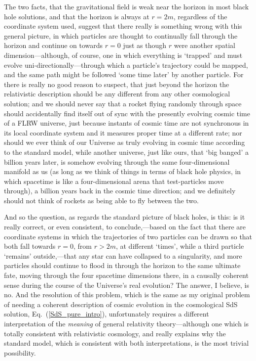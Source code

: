 The two facts, that the gravitational field is weak near the horizon in most black hole solutions, and that the horizon is always at $r=2m$, regardless of the coordinate system used, suggest that there really is something wrong with this general picture, in which particles are thought to continually fall through the horizon and continue on towards $r=0$ just as though $r$ were another spatial dimension---although, of course, one in which everything is `trapped' and must evolve uni-directionally---through which a particle's trajectory could be mapped, and the same path might be followed `some time later' by another particle.  For there is really no good reason to suspect, that just beyond the horizon the relativistic description should be any different from any other cosmological solution; and we should never say that a rocket flying randomly through space should accidentally find itself out of sync with the presently evolving cosmic time of a FLRW universe, just because instants of cosmic time are not synchronous in its local coordinate system and it measures proper time at a different rate; nor should we ever think of our Universe as truly evolving in cosmic time according to the standard model, while another universe, just like ours, that `big banged' a billion years later, is somehow evolving through the same four-dimensional manifold as us (as long as we think of things in terms of black hole physics, in which spacetime is like a four-dimensional arena that test-particles move through), a billion years back in the cosmic time direction; and we definitely should not think of rockets as being able to fly between the two.

And so the question, as regards the standard picture of black holes, is this: is it really correct, or even consistent, to conclude,---based on the fact that there are coordinate systems in which the trajectories of two particles can be drawn so that both fall towards $r=0$, from $r>2m$, at different `times', while a third particle `remains' outside,---that any star can have collapsed to a singularity, and more particles should continue to flood in through the horizon to the same ultimate fate, moving through the four spacetime dimensions there, in a causally coherent sense during the course of the Universe's real evolution? The answer, I believe, is no. And the resolution of this problem, which is the same as my original problem of needing a coherent description of cosmic evolution in the cosmological SdS solution, Eq.~(\ref{SdS_pure_intro}), unfortunately requires a different interpretation of the \textit{meaning} of general relativity theory---although one which is totally consistent with relativistic cosmology, and really explains why the standard model, which is consistent with both interpretations, is the most trivial possibility.

